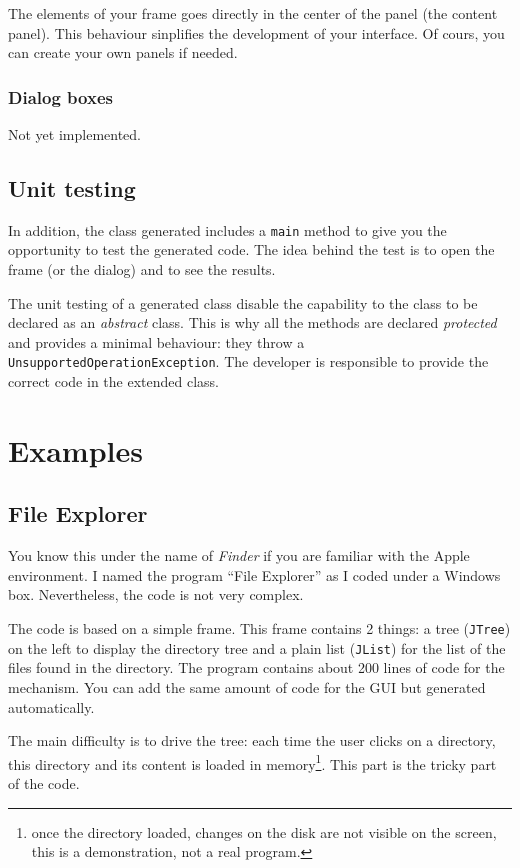 \documentclass[a4paper,onecolumn,10pt]{book}
\newcommand{\jclass}[1]{\texttt{\small #1}}
\begin{document}
The elements of your frame goes directly in the center of the panel
(the content panel). This behaviour sinplifies the development of
your interface. Of cours, you can create your own panels if needed.



\subsection{Dialog boxes}
Not yet implemented.

\section{\label{sec:testing}Unit testing}
In addition, the class generated includes a \verb|main| method to give you
the opportunity to test the generated code. The idea behind the test is to
open the frame (or the dialog) and to see the results.
 

The unit testing of a generated class disable the capability to the class to be
declared as an \emph{abstract} class. This is why all the methods are declared
\emph{protected} and provides a minimal behaviour: they throw a
\jclass{UnsupportedOperationException}. The developer is responsible to provide
the correct code in the extended class.
 
\chapter{Examples}
\section{File Explorer}
You know this under the name of \emph{Finder} if you are familiar with
the Apple environment. I named the program ``File Explorer'' as I coded under
a Windows box. Nevertheless, the code is not very complex.

The code is based on a simple frame. This frame contains 2 things: a tree
(\jclass{JTree}) on the left to display the directory tree and a plain list
(\jclass{JList}) for the list of the files found in the directory. The program
contains about 200 lines of code for the mechanism. You can add the same amount
of code for the GUI but generated automatically.

The main difficulty is to drive the tree: each time the user clicks on a 
directory, this directory and its content is loaded in memory\footnote{once
the directory loaded, changes on the disk are not visible on the screen, this
is a demonstration, not a real program.}. This part is the tricky part of the
code.
\end{document}

